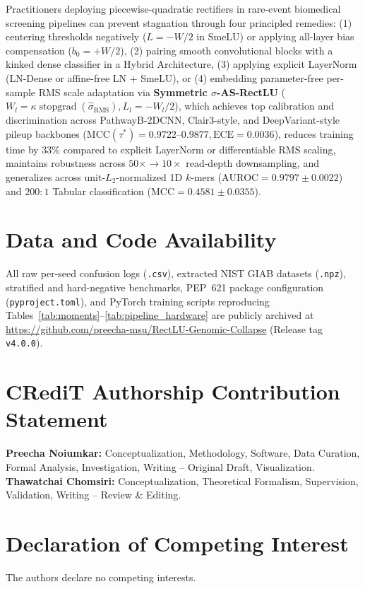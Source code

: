 \documentclass[10pt,a4paper]{article}
\begin{document}
Practitioners deploying piecewise-quadratic rectifiers in rare-event biomedical screening pipelines can prevent stagnation through four principled remedies: (1) centering thresholds negatively ($L = -W/2$ in SmeLU) or applying all-layer bias compensation ($b_0 = +W/2$), (2) pairing smooth convolutional blocks with a kinked dense classifier in a Hybrid Architecture, (3) applying explicit LayerNorm (LN-Dense or affine-free LN + SmeLU), or (4) embedding parameter-free per-sample RMS scale adaptation via \textbf{Symmetric $\sigma$-AS-RectLU} ($W_l = \kappa\operatorname{stopgrad}(\hat{\sigma}_{\text{RMS}}), L_l = -W_l/2$), which achieves top calibration and discrimination across PathwayB-2DCNN, Clair3-style, and DeepVariant-style pileup backbones ($\text{MCC}(\tau^*) = 0.9722$--$0.9877, \text{ECE} = 0.0036$), reduces training time by $33\%$ compared to explicit LayerNorm or differentiable RMS scaling, maintains robustness across $50\times \to 10\times$ read-depth downsampling, and generalizes across unit-$L_2$-normalized 1D $k$-mers ($\text{AUROC} = 0.9797 \pm 0.0022$) and $200:1$ Tabular classification ($\text{MCC} = 0.4581 \pm 0.0355$).

\section*{Data and Code Availability}
All raw per-seed confusion logs (\texttt{.csv}), extracted NIST GIAB datasets (\texttt{.npz}), stratified and hard-negative benchmarks, PEP~621 package configuration (\texttt{pyproject.toml}), and PyTorch training scripts reproducing Tables~\ref{tab:moments}--\ref{tab:pipeline_hardware} are publicly archived at \url{https://github.com/preecha-msu/RectLU-Genomic-Collapse} (Release tag \texttt{v4.0.0}).

\section*{CRediT Authorship Contribution Statement}
\textbf{Preecha Noiumkar:} Conceptualization, Methodology, Software, Data Curation, Formal Analysis, Investigation, Writing -- Original Draft, Visualization. \textbf{Thawatchai Chomsiri:} Conceptualization, Theoretical Formalism, Supervision, Validation, Writing -- Review \& Editing.

\section*{Declaration of Competing Interest}
The authors declare no competing interests.
\end{document}
